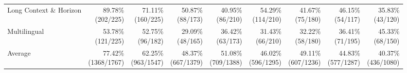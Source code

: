 \documentclass{article} %
\begin{document}
\begin{table}[htbp]
{\begin{tabular}{@{}lrrrrrrrr@{}}
			Long Context \& Horizon & \shortstack{89.78\%\\(202/225)} & \shortstack{71.11\%\\(160/225)} & \shortstack{50.87\%\\(88/173)} & \shortstack{40.95\%\\(86/210)} & \shortstack{54.29\%\\(114/210)} & \shortstack{41.67\%\\(75/180)} & \shortstack{46.15\%\\(54/117)} & \shortstack{35.83\%\\(43/120)} \\
			Multilingual & \shortstack{53.78\%\\(121/225)} & \shortstack{52.75\%\\(96/182)} & \shortstack{29.09\%\\(48/165)} & \shortstack{36.42\%\\(63/173)} & \shortstack{31.43\%\\(66/210)} & \shortstack{32.22\%\\(58/180)} & \shortstack{36.41\%\\(71/195)} & \shortstack{45.33\%\\(68/150)} \\
			Average & \shortstack{77.42\%\\(1368/1767)} & \shortstack{62.25\%\\(963/1547)} & \shortstack{48.37\%\\(667/1379)} & \shortstack{51.08\%\\(709/1388)} & \shortstack{46.02\%\\(596/1295)} & \shortstack{49.11\%\\(607/1236)} & \shortstack{44.83\%\\(577/1287)} & \shortstack{40.37\%\\(436/1080)} \\
			\bottomrule
		\end{tabular}%
		}
	\end{table}
\end{document}
